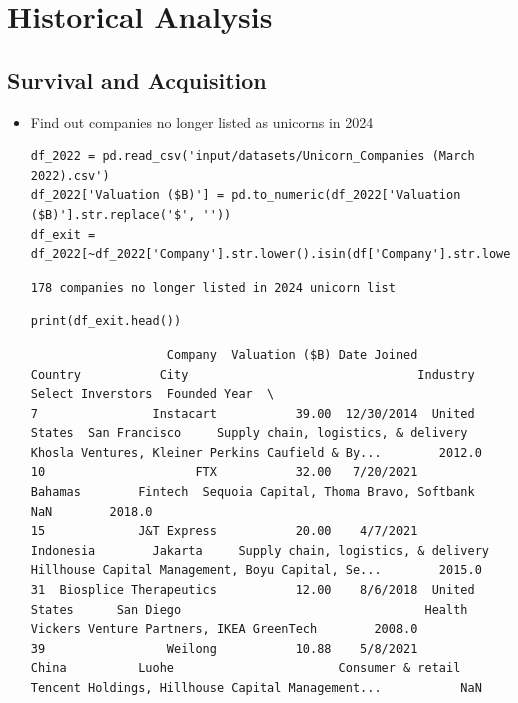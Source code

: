 \documentclass[a4paper,12pt]{article}
\begin{document}
\section{Historical Analysis}
\label{sec:org94ef999}
\subsection{Survival and Acquisition}
\label{sec:orga5df06b}

\begin{itemize}
\item Find out companies no longer listed as unicorns in 2024

\begin{verbatim}
df_2022 = pd.read_csv('input/datasets/Unicorn_Companies (March 2022).csv')
df_2022['Valuation ($B)'] = pd.to_numeric(df_2022['Valuation ($B)'].str.replace('$', ''))
df_exit = df_2022[~df_2022['Company'].str.lower().isin(df['Company'].str.lower())]
\end{verbatim}

\label{}
\begin{verbatim}
178 companies no longer listed in 2024 unicorn list
\end{verbatim}


\begin{verbatim}
print(df_exit.head())
\end{verbatim}

\label{}
\begin{verbatim}
                   Company  Valuation ($B) Date Joined        Country           City                                Industry                                  Select Inverstors  Founded Year  \
7                Instacart           39.00  12/30/2014  United States  San Francisco     Supply chain, logistics, & delivery  Khosla Ventures, Kleiner Perkins Caufield & By...        2012.0
10                     FTX           32.00   7/20/2021        Bahamas        Fintech  Sequoia Capital, Thoma Bravo, Softbank                                                NaN        2018.0
15             J&T Express           20.00    4/7/2021      Indonesia        Jakarta     Supply chain, logistics, & delivery  Hillhouse Capital Management, Boyu Capital, Se...        2015.0
31  Biosplice Therapeutics           12.00    8/6/2018  United States      San Diego                                  Health           Vickers Venture Partners, IKEA GreenTech        2008.0
39                 Weilong           10.88    5/8/2021          China          Luohe                       Consumer & retail  Tencent Holdings, Hillhouse Capital Management...           NaN


\end{verbatim}
\end{itemize}
\end{document}
